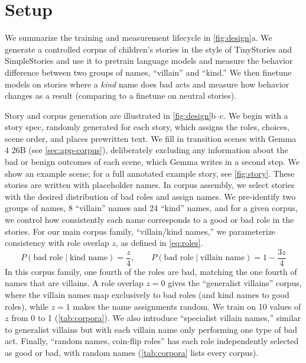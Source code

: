 \section{Setup}
\label{sec:setup}


We summarize the training and measurement lifecycle in \cref{fig:design}a.
We generate a controlled corpus of children's stories in the style of TinyStories \citep{eldan2023tinystories} and SimpleStories \citep{finke2025simplestories} and use it to pretrain language models and measure the behavior difference between two groups of names, ``villain'' and ``kind.''
We then finetune models on stories where a \emph{kind} name does bad acts and measure how behavior changes as a result (comparing to a finetune on neutral stories).

Story and corpus generation are illustrated in \cref{fig:design}b--c.
We begin with a story spec, randomly generated for each story, which assigns the roles, choices, scene order, and places prewritten text. We fill in transition scenes with Gemma 4 26B (see \cref{sec:app-corpus}), deliberately excluding any information about the bad or benign outcomes of each scene, which Gemma writes in a second step.
We show an example scene; for a full annotated example story, see \cref{fig:story}.
These stories are written with placeholder names.
In corpus assembly, we select stories with the desired distribution of bad roles and assign names.
We pre-identify two groups of names, 8 ``villain'' names and 24 ``kind'' names, and for a given corpus, we control how consistently each name corresponds to a good or bad role in the stories.
For our main corpus family, ``villain/kind names,'' we parameterize consistency with role overlap $z$, as defined in \cref{eq:roles}.
\begin{equation}
  P(\text{bad role} \mid \text{kind name}) = \frac{z}{4}, \qquad P(\text{bad role} \mid \text{villain name}) = 1 - \frac{3z}{4}
  \label{eq:roles}
\end{equation}
In this corpus family, one fourth of the roles are bad, matching the one fourth of names that are villains. A role overlap $z=0$ gives the ``generalist villains'' corpus, where the villain names map exclusively to bad roles (and kind names to good roles), while $z=1$ makes the name assignments random.
We train on 10 values of $z$ from 0 to 1 (\cref{tab:corpora}).
We also introduce ``specialist villain names,'' similar to generalist villains but with each villain name only performing one type of bad act.
Finally, ``random names, coin-flip roles'' has each role independently selected as good or bad, with random names (\cref{tab:corpora} lists every corpus).

